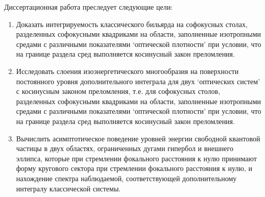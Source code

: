 \begin{frame}
Диссертационная работа преследует следующие цели:
\begin{enumerate}[beginpenalty=10000] %
  \item Доказать интегрируемость классического бильярда на софокусных столах, разделенных софокусными квадриками на области, заполненные изотропными средами с различными показателями `оптической плотности' при условии, что на границе раздела сред выполняется косинусный закон преломления.
 \item Исследовать слоения изоэнергетического многообразия на поверхности постоянного уровня дополнительного интеграла для двух `оптических систем' с косинусным законом преломления, т.е. для софокусных столов, разделенных софокусными квадриками на области, заполненные изотропными средами с различными показателями `оптической плотности'  при условии, что на границе раздела сред выполняется косинусный закон преломления.
   \item Вычислить асимптотическое поведение уровней энергии свободной квантовой частицы в двух областях, ограниченных дугами гипербол и внешнего эллипса, которые при стремлении фокального расстояния к нулю принимают форму кругового сектора при стремлении фокального расстояния к нулю, и нахождение спектра наблюдаемой, соответствующей дополнительному интегралу классической системы.
\end{enumerate}

\end{frame}
